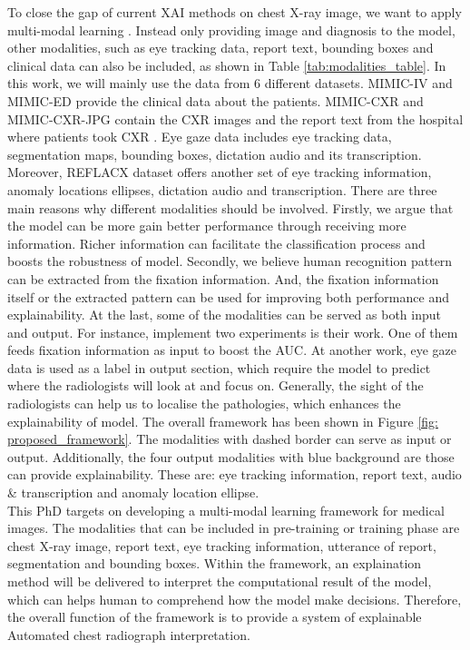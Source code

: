 To close the gap of current XAI methods on chest X-ray image, we want to apply multi-modal learning \citep{Ngiam2011MultiModalLearning}. Instead only providing image and diagnosis to the model, other modalities, such as eye tracking data, report text, bounding boxes and clinical data can also be included, as shown in Table \ref{tab:modalities_table}. In this work, we will mainly use the data from 6 different datasets. MIMIC-IV \citep{Johnson2021MIMIC_IV} and MIMIC-ED \citep{Johnson2021MIMIC_IV_ED} provide the clinical data about the patients. MIMIC-CXR \citep{Johnson2019MIMIC_CXR} and MIMIC-CXR-JPG \citep{DJohnson2019MIMIC_CXR_JPG} contain the CXR images and the report text from the hospital where patients took CXR . Eye gaze data \citep{Karargyris2020EyeGazeDataset} includes eye tracking data, segmentation maps, bounding boxes, dictation audio and its transcription. Moreover, REFLACX dataset \citep{Lanfredi2021REFLACX} offers another set of eye tracking information, anomaly locations ellipses, dictation audio and transcription. There are three main reasons why different modalities should be involved. Firstly, we argue that the model can be more gain better performance through receiving more information. Richer information can facilitate the classification process and boosts the robustness of model. Secondly, we believe human recognition pattern can be extracted from the fixation information. And, the fixation information itself or the extracted pattern can be used for improving both performance and explainability. At the last, some of the modalities can be served as both input and output. For instance, \citet{Karargyris2021EyeGazePaper} implement two experiments is their work. One of them feeds fixation information as input to boost the AUC. At another work, eye gaze data is used as a label in output section, which require the model to predict where the radiologists will look at and focus on. Generally, the sight of the radiologists can help us to localise the pathologies, which enhances the explainability of model. The overall framework has been shown in Figure \ref{fig: proposed_framework}. The modalities with dashed border can serve as input or output. Additionally, the four output modalities with blue background are those can provide explainability. These are: eye tracking information, report text, audio \& transcription and anomaly location ellipse.\\

This PhD targets on developing a multi-modal learning framework for medical images. The modalities that can be included in pre-training or training phase are chest X-ray image, report text, eye tracking information, utterance of report, segmentation and bounding boxes. Within the framework, an explaination method will be delivered to interpret the computational result of the model, which can helps human to comprehend how the model make decisions. Therefore, the overall function of the framework is to provide a system of explainable Automated chest radiograph interpretation. \\
\\
\\


